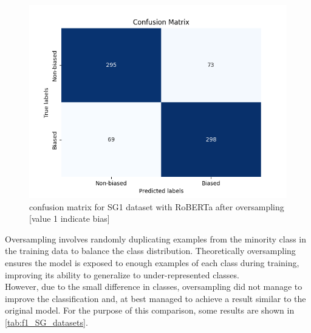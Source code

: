 \documentclass[11pt,a4paper]{article}
\begin{document}
\begin{figure}[H]
    \centering
    \includegraphics[width=0.9\linewidth]{cm_SG1_cl.png}
    \caption{confusion matrix for SG1 dataset with RoBERTa after oversampling [value 1 indicate bias]}
    \label{fig:enter-label}
\end{figure}

Oversampling involves randomly duplicating examples from the minority class in the training data to balance the class distribution. Theoretically oversampling ensures the model is exposed to enough examples of each class during training, improving its ability to generalize to under-represented classes. \\
However, due to the small difference in classes, oversampling did not manage to improve the classification and, at best managed to achieve a result similar to the original model. For the purpose of this comparison, some results are shown in \ref{tab:f1_SG_datasets}.
\end{document}
